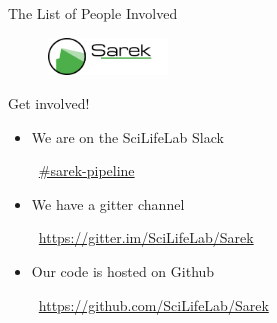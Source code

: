 \documentclass{beamer}
\begin{document}
\begin{frame}{The List of People Involved}
	\begin{figure}
		\includegraphics[height=1cm]{pictures/Sarek}
	\end{figure}
	\begin{table}
	\end{table}
\end{frame}

\begin{frame}{Get involved!}
	\begin{itemize}
		\item We are on the SciLifeLab Slack

		\faSlack\ \href{https://scilifelab.slack.com/}{\#sarek-pipeline}
	\end{itemize}
	\pause
	\begin{itemize}
		\item We have a gitter channel

		\faGitter\ \url{https://gitter.im/SciLifeLab/Sarek}
	\end{itemize}
	\pause
	\begin{itemize}
		\item Our code is hosted on Github

		\faGithub\ \url{https://github.com/SciLifeLab/Sarek}
	\end{itemize}
\end{frame}
\end{document}
